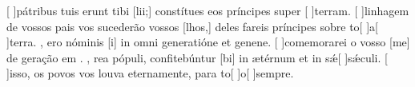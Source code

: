 {  %
  {[ ]{pá}tribus tuis erunt tibi [lii;] constítues eos príncipes super [ ]{ter}ram. }%
    {[ ]{li}nhagem de vossos pais vos sucederão vossos [\-lhos,] deles fareis príncipes sobre to[ ]{a}[ ]{ter}ra. },
  { ero nóminis [i] in omni generatióne et genene. }%
    {[ ]{co}memorarei o vosso [me] de geração em . },
  {rea pópuli, confitebúntur [bi] in ætérnum et in sǽ[ ]{sǽ}culi. }%
    {[ ]{is}so, os povos vos louva eternamente, para to[ ]{o}[ ]{sem}pre. }
}